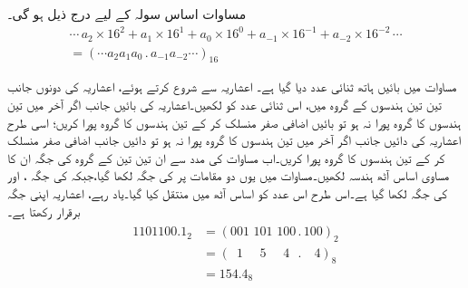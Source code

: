 مساوات  اساس سولہ کے لیے درج ذیل ہو گی۔
\begin{multline}\label{مساوات_ثنائی_عمومی_روپ_سادس}
\cdots\,a_2\times 16^2+a_1\times 16^1+a_0\times 16^0+a_{-1}\times 16^{-1}+a_{-2}\times 16^{-2}\,\cdots\\
=(\cdots a_2a_1a_0\, .\, a_{-1}a_{-2}\cdots)_{16}
\end{multline}
 

	مساوات  میں بائیں ہاتھ ثنائی عدد دیا گیا ہے۔ اعشاریہ سے شروع کرتے ہوئے، اعشاریہ کی دونوں جانب تین تین ہندسوں کے گروہ میں، اس ثنائی عدد کو لکھیں۔اعشاریہ کی بائیں جانب اگر آخر میں تین ہندسوں کا گروہ پورا نہ ہو تو بائیں اضافی صفر منسلک کر کے تین ہندسوں کا گروہ پورا کریں؛ اسی طرح اعشاریہ کی دائیں جانب اگر آخر میں تین ہندسوں کا گروہ پورا نہ ہو تو دائیں جانب اضافی صفر منسلک کر کے تین ہندسوں کا گروہ پورا کریں۔اب مساوات  کی مدد سے ان تین تین کے گروہ کی جگہ ان کا مساوی اساس آٹھ ہندسہ لکھیں۔مساوات  میں یوں دو مقامات پر  کی جگہ  لکھا گیا،جبکہ  کی جگہ ، اور  کی جگہ  لکھا گیا ہے۔اس طرح اس عدد کو اساس آٹھ میں منتقل کیا گیا۔یاد رہے، اعشاریہ اپنی جگہ برقرار رکھتا ہے۔
	\begin{gather}
	\begin{aligned}\label{مساوات_ثنائی_تبدیلی_آٹھ}
	1101100.1_2&=(001\,\, 101 \,\,100 \,. \,100)_2\\
	&=(\phantom{0} 1\,\,\quad 5\,\,\quad 4\,\,\,\, . \quad 4)_8\\
	&=154.4_8
	\end{aligned}
	\end{gather}


